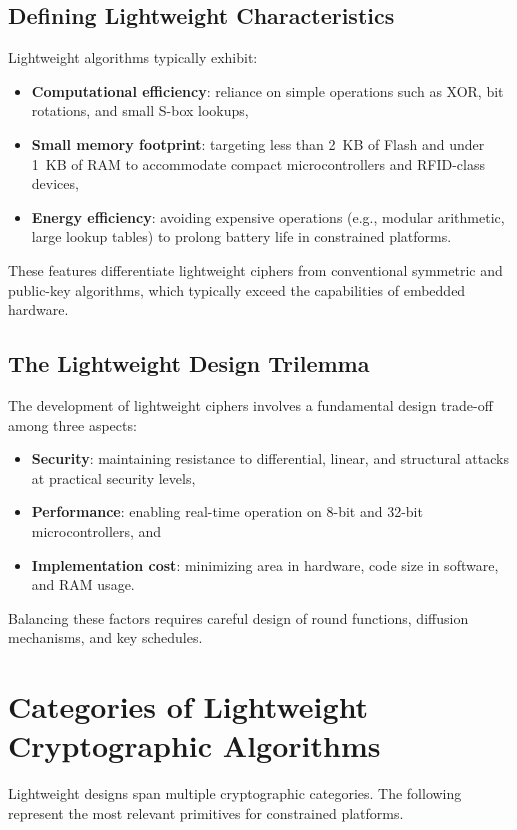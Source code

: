 \documentclass[12pt]{report}
\begin{document}
\subsection*{Defining Lightweight Characteristics}

Lightweight algorithms typically exhibit:
\begin{itemize}
    \item \textbf{Computational efficiency}: reliance on simple operations such as XOR, bit rotations, and small S-box lookups,
    \item \textbf{Small memory footprint}: targeting less than 2~KB of Flash and under 1~KB of RAM to accommodate
          compact microcontrollers and RFID-class devices,
    \item \textbf{Energy efficiency}: avoiding expensive operations (e.g., modular arithmetic, large lookup tables)
          to prolong battery life in constrained platforms.
\end{itemize}

These features differentiate lightweight ciphers from conventional symmetric and public-key
algorithms, which typically exceed the capabilities of embedded hardware.

\subsection*{The Lightweight Design Trilemma}

The development of lightweight ciphers involves a fundamental design trade-off among three aspects:
\begin{itemize}
    \item \textbf{Security}: maintaining resistance to differential, linear, and structural attacks at practical security levels,
    \item \textbf{Performance}: enabling real-time operation on 8-bit and 32-bit microcontrollers, and
    \item \textbf{Implementation cost}: minimizing area in hardware, code size in software, and RAM usage.
\end{itemize}

Balancing these factors requires careful design of round functions, diffusion mechanisms, and key schedules.

\section{Categories of Lightweight Cryptographic Algorithms}
Lightweight designs span multiple cryptographic categories. The following represent the most
relevant primitives for constrained platforms.
\end{document}
